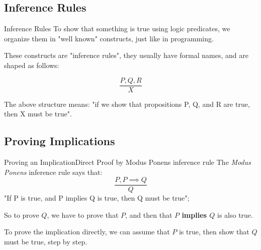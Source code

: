 \subsection{Inference Rules}

\begin{frame}[t]{Inference Rules}{}
  To show that something is true using logic predicates, we organize them in "well known" constructs, just like in programming.\bigskip

  These constructs are "inference rules", they usually have formal names, and are shaped as follows:\bigskip

  \[
  \frac{P, Q, R}{X}
  \]\bigskip

  The above structure means: "if we show that propositions P, Q, and R are true, then X must be true".\bigskip
\end{frame}




\subsection{Proving Implications}

\begin{frame}[t]{Proving an Implication}{Direct Proof by Modus Ponens inference rule}
  The \emph{Modus Ponens} inference rule says that:
  \[
  \frac{P, P\implies Q}{Q}
  \]\bigskip 
  "If P is true, and P implies Q is true, then Q must be true";\medskip

  So to prove $Q$, we have to prove that $P$, and then that {\bf $P$ implies $Q$} is also true.\bigskip

  To prove the implication directly, we can assume that $P$ is true, then show that $Q$ must be true, step by step.\bigskip
\end{frame}

